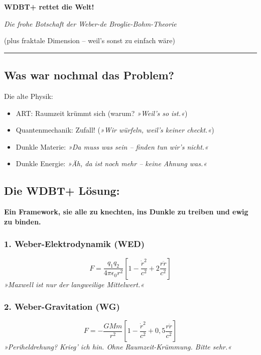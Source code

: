 \documentclass[10pt,a5paper]{article}
\begin{document}
\begin{center}
    {\Huge\bfseries WDBT+ rettet die Welt!}

    \vspace{0.2cm}
    {\large\itshape Die frohe Botschaft der Weber-de Broglie-Bohm-Theorie}
    
    \vspace{0.1cm}
    {\small (plus fraktale Dimension – weil's sonst zu einfach wäre)}
\end{center}

\vspace{0.3cm}
\hrule
\vspace{0.3cm}

\subsection*{Was war nochmal das Problem?}
Die alte Physik: 
\begin{itemize}
    \item ART: Raumzeit krümmt sich (warum? \textit{»Weil's so ist.«})
    \item Quantenmechanik: Zufall! (\textit{»Wir würfeln, weil's keiner checkt.«})
    \item Dunkle Materie: \textit{»Da muss was sein – finden tun wir's nicht.«}
    \item Dunkle Energie: \textit{»Äh, da ist noch mehr – keine Ahnung was.«}
\end{itemize}

\subsection*{Die WDBT+ Lösung:}
\textbf{Ein Framework, sie alle zu knechten, ins Dunkle zu treiben und ewig zu binden.}

\subsubsection*{1. Weber-Elektrodynamik (WED)}
\[
F = \frac{q_1q_2}{4\pi\epsilon_0 r^2}\left[1 - \frac{\dot{r}^2}{c^2} + 2\frac{r\ddot{r}}{c^2}\right]
\]
\textit{»Maxwell ist nur der langweilige Mittelwert.«}

\subsubsection*{2. Weber-Gravitation (WG)}
\[
F = -\frac{GMm}{r^2}\left[1 - \frac{\dot{r}^2}{c^2} + 0,5\frac{r\ddot{r}}{c^2}\right]
\]
\textit{»Periheldrehung? Krieg' ich hin. Ohne Raumzeit-Krümmung. Bitte sehr.«}
\end{document}
